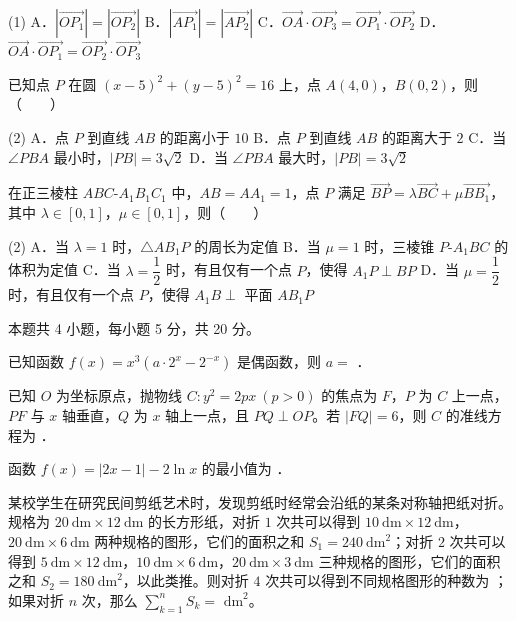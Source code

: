 \begin{gkopts}(1)
\task A．$\left|\overrightarrow{OP_1}\right|=\left|\overrightarrow{OP_2}\right|$
\task B．$\left|\overrightarrow{AP_1}\right|=\left|\overrightarrow{AP_2}\right|$
\task C．$\overrightarrow{OA}\cdot\overrightarrow{OP_3}=\overrightarrow{OP_1}\cdot\overrightarrow{OP_2}$
\task D．$\overrightarrow{OA}\cdot\overrightarrow{OP_1}=\overrightarrow{OP_2}\cdot\overrightarrow{OP_3}$
\end{gkopts}

已知点 $P$ 在圆 $(x-5)^{2}+(y-5)^{2}=16$ 上，点 $A(4,0)$，$B(0,2)$，则（　　）

\begin{gkopts}(2)
\task A．点 $P$ 到直线 $AB$ 的距离小于 $10$
\task B．点 $P$ 到直线 $AB$ 的距离大于 $2$
\task C．当 $\angle PBA$ 最小时，$|PB|=3\sqrt2$
\task D．当 $\angle PBA$ 最大时，$|PB|=3\sqrt2$
\end{gkopts}

在正三棱柱 $ABC\text{-}A_1B_1C_1$ 中，$AB=AA_1=1$，点 $P$ 满足 $\overrightarrow{BP}=\lambda\overrightarrow{BC}+\mu\overrightarrow{BB_1}$，其中 $\lambda\in[0,1]$，$\mu\in[0,1]$，则（　　）

\begin{gkopts}(2)
\task A．当 $\lambda=1$ 时，$\triangle AB_1P$ 的周长为定值
\task B．当 $\mu=1$ 时，三棱锥 $P\text{-}A_1BC$ 的体积为定值
\task C．当 $\lambda=\dfrac12$ 时，有且仅有一个点 $P$，使得 $A_1P\perp BP$
\task D．当 $\mu=\dfrac12$ 时，有且仅有一个点 $P$，使得 $A_1B\perp$ 平面 $AB_1P$
\end{gkopts}

\par\medskip


\begin{gktip}
本题共 4 小题，每小题 5 分，共 20 分。
\end{gktip}

已知函数 $f(x)=x^{3}\left(a\cdot2^{x}-2^{-x}\right)$ 是偶函数，则 $a=$ \gkblank{}．

已知 $O$ 为坐标原点，抛物线 $C:y^{2}=2px\ (p>0)$ 的焦点为 $F$，$P$ 为 $C$ 上一点，$PF$ 与 $x$ 轴垂直，$Q$ 为 $x$ 轴上一点，且 $PQ\perp OP$。若 $|FQ|=6$，则 $C$ 的准线方程为 \gkblank{}．

函数 $f(x)=|2x-1|-2\ln x$ 的最小值为 \gkblank{}．

某校学生在研究民间剪纸艺术时，发现剪纸时经常会沿纸的某条对称轴把纸对折。规格为 $20\ \mathrm{dm}\times12\ \mathrm{dm}$ 的长方形纸，对折 $1$ 次共可以得到 $10\ \mathrm{dm}\times12\ \mathrm{dm}$，$20\ \mathrm{dm}\times6\ \mathrm{dm}$ 两种规格的图形，它们的面积之和 $S_1=240\ \mathrm{dm}^{2}$；对折 $2$ 次共可以得到 $5\ \mathrm{dm}\times12\ \mathrm{dm}$，$10\ \mathrm{dm}\times6\ \mathrm{dm}$，$20\ \mathrm{dm}\times3\ \mathrm{dm}$ 三种规格的图形，它们的面积之和 $S_2=180\ \mathrm{dm}^{2}$，以此类推。则对折 $4$ 次共可以得到不同规格图形的种数为 \gkblank{}；如果对折 $n$ 次，那么 $\displaystyle\sum_{k=1}^{n}S_k=$ \gkblank{} $\mathrm{dm}^{2}$。


